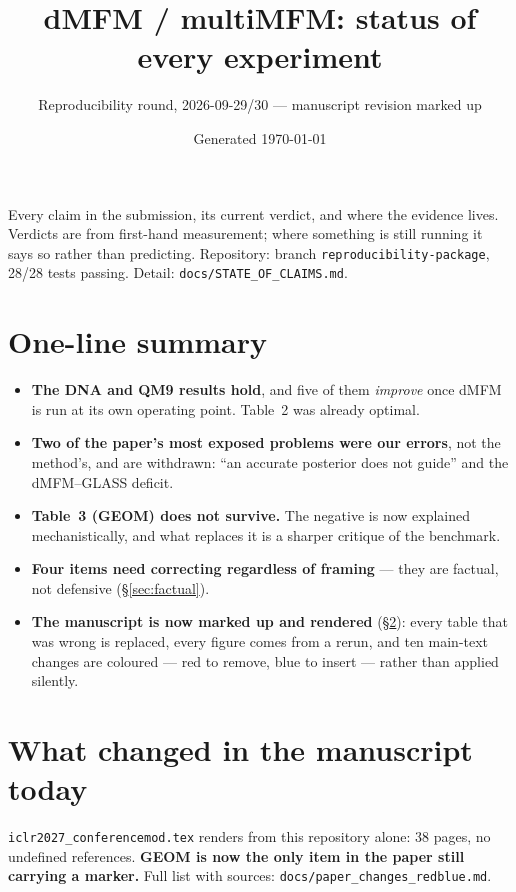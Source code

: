 \documentclass[10pt]{article}
\title{\textbf{dMFM / multiMFM: status of every experiment}}
\author{Reproducibility round, 2026-09-29/30 --- manuscript revision marked up}
\date{Generated \today}
\begin{document}
\maketitle

\noindent
Every claim in the submission, its current verdict, and where the evidence lives.
Verdicts are from first-hand measurement; where something is still running it says so rather
than predicting. Repository: branch \texttt{reproducibility-package}, 28/28 tests
passing. Detail: \texttt{docs/STATE\_OF\_CLAIMS.md}.

\section{One-line summary}

\begin{itemize}\itemsep2pt
\item \textbf{The DNA and QM9 results hold}, and five of them \emph{improve} once dMFM is run at
      its own operating point. Table~2 was already optimal.
\item \textbf{Two of the paper's most exposed problems were our errors}, not the method's, and are
      withdrawn: ``an accurate posterior does not guide'' and the dMFM--GLASS deficit.
\item \textbf{Table~3 (GEOM) does not survive.} The negative is now explained mechanistically, and
      what replaces it is a sharper critique of the benchmark.
\item \textbf{Four items need correcting regardless of framing} --- they are factual, not
      defensive (\S\ref{sec:factual}).
\item \textbf{The manuscript is now marked up and rendered} (\S\ref{sec:manuscript}): every table
      that was wrong is replaced, every figure comes from a rerun, and ten main-text changes are
      coloured --- red to remove, blue to insert --- rather than applied silently.
\end{itemize}

\section{What changed in the manuscript today}
\label{sec:manuscript}

\texttt{iclr2027\_conferencemod.tex} renders from this repository alone: 38 pages, no undefined
references. \textbf{GEOM is now the only item in the paper still carrying a marker.} Full list with
sources: \texttt{docs/paper\_changes\_redblue.md}.
\end{document}
